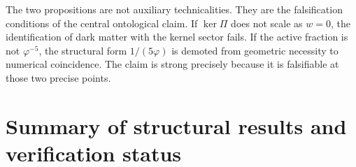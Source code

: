 \documentclass[twocolumn,10pt]{article}
\newcommand{\vp}{\varphi}
\newcommand{\kerPi}{\ker\Pi}
\begin{document}
The two propositions are not auxiliary technicalities. They are the
falsification conditions of the central ontological claim. If
$\kerPi$ does not scale as $w=0$, the identification of dark matter
with the kernel sector fails. If the active fraction is not $\vp^{-5}$,
the structural form $1/(5\vp)$ is demoted from geometric necessity to
numerical coincidence. The claim is strong precisely because it is
falsifiable at those two precise points.

\section{Summary of structural results and verification status}
\label{sec:open}
\end{document}
